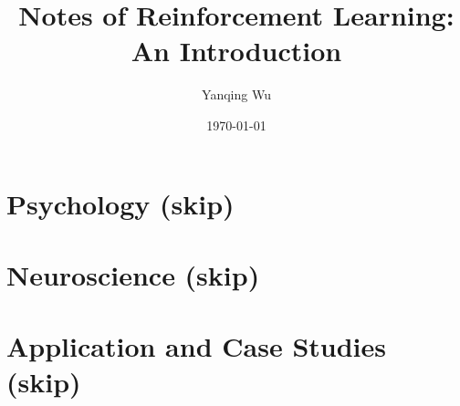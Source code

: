 \documentclass[lang=en,mode=geye,device=normal,color=blue,14pt]{elegantnote}
\title{Notes of Reinforcement Learning: An Introduction}
\author{Yanqing Wu}
\date{\today}
\DeclareMathOperator*{\1}{\mathbbm{1}}
\begin{document}
\maketitle

\setlength{\parindent}{0pt}
\tableofcontents
































\newpage





\newpage
\section{Psychology (skip)}
\section{Neuroscience (skip)}
\section{Application and Case Studies (skip)}












\end{document}
